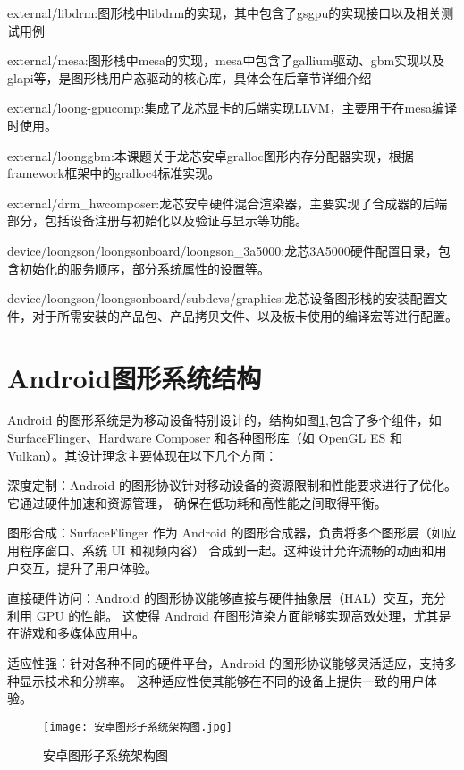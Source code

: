   external/libdrm:图形栈中libdrm的实现，其中包含了gsgpu的实现接口以及相关测试用例

  external/mesa:图形栈中mesa的实现，mesa中包含了gallium驱动、gbm实现以及glapi等，是图形栈用户态驱动的核心库，具体会在后章节详细介绍

  external/loong-gpucomp:集成了龙芯显卡的后端实现LLVM，主要用于在mesa编译时使用。

  external/loonggbm:本课题关于龙芯安卓gralloc图形内存分配器实现，根据framework框架中的gralloc4标准实现。

  external/drm\_hwcomposer:龙芯安卓硬件混合渲染器，主要实现了合成器的后端部分，包括设备注册与初始化以及验证与显示等功能。

  device/loongson/loongsonboard/loongson\_3a5000:龙芯3A5000硬件配置目录，包含初始化的服务顺序，部分系统属性的设置等。

  device/loongson/loongsonboard/subdevs/graphics:龙芯设备图形栈的安装配置文件，对于所需安装的产品包、产品拷贝文件、以及板卡使用的编译宏等进行配置。

\section{Android图形系统结构}
\label{sec:Android图形系统结构}
Android 的图形系统是为移动设备特别设计的，结构如图\ref{fig:安卓图形子系统架构图},包含了多个组件，如 SurfaceFlinger、Hardware Composer 
和各种图形库（如 OpenGL ES 和 Vulkan）。其设计理念主要体现在以下几个方面：

深度定制：Android 的图形协议针对移动设备的资源限制和性能要求进行了优化。它通过硬件加速和资源管理，
确保在低功耗和高性能之间取得平衡。

图形合成：SurfaceFlinger 作为 Android 的图形合成器，负责将多个图形层（如应用程序窗口、系统 UI 和视频内容）
合成到一起。这种设计允许流畅的动画和用户交互，提升了用户体验。

直接硬件访问：Android 的图形协议能够直接与硬件抽象层（HAL）交互，充分利用 GPU 的性能。
这使得 Android 在图形渲染方面能够实现高效处理，尤其是在游戏和多媒体应用中。

适应性强：针对各种不同的硬件平台，Android 的图形协议能够灵活适应，支持多种显示技术和分辨率。
这种适应性使其能够在不同的设备上提供一致的用户体验。

\begin{figure}[h]
  \centering
  \texttt{[image: 安卓图形子系统架构图.jpg]}
  \caption{安卓图形子系统架构图}
  \label{fig:安卓图形子系统架构图}
\end{figure}

